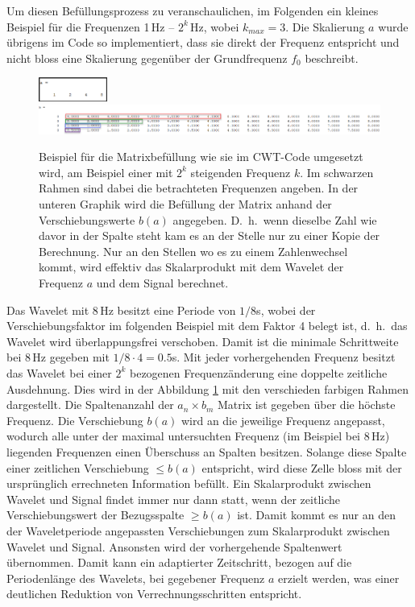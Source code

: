 Um diesen Befüllungsprozess zu veranschaulichen, im Folgenden ein
kleines Beispiel für die Frequenzen 1\,Hz – $2^k$\,Hz, wobei $k_{max}
= 3$.
Die Skalierung $a$ wurde übrigens im Code so implementiert, dass
sie direkt der Frequenz entspricht und nicht bloss eine Skalierung
gegenüber der Grundfrequenz $f_0$ beschreibt.

\begin{figure}
	\centering
	\includegraphics[width=0.2\textwidth]{papers/wavelets/images/17-1_a-Array.png}
	\includegraphics[width=\textwidth]{papers/wavelets/images/17-2_BspFillUp.png}
	\caption{Beispiel für die Matrixbefüllung wie sie im CWT-Code
	umgesetzt wird, am Beispiel einer mit $2^k$ steigenden
	Frequenz $k$.
	Im schwarzen Rahmen sind dabei die betrachteten Frequenzen angeben.
	In der unteren Graphik wird die Befüllung der Matrix anhand
	der Verschiebungswerte $b(a)$ angegeben.
	D.~h.~wenn dieselbe Zahl wie davor in der Spalte steht kam
	es an der Stelle nur zu einer Kopie der Berechnung.
	Nur an den Stellen wo es zu einem Zahlenwechsel kommt, wird
	effektiv das Skalarprodukt mit dem Wavelet der Frequenz $a$
	und dem Signal berechnet.}
	\label{wavelet:fig:BspFillUp}
\end{figure}

Das Wavelet mit 8\,Hz besitzt eine Periode von $1/8$s, wobei der
Verschiebungsfaktor im folgenden Beispiel mit dem Faktor 4 belegt
ist, d.~h.~das Wavelet wird überlappungsfrei verschoben.
Damit ist die minimale Schrittweite bei 8\,Hz gegeben mit $1/8\cdot4=0.5$s.
Mit jeder vorhergehenden Frequenz besitzt das Wavelet bei einer
$2^k$ bezogenen Frequenzänderung eine doppelte zeitliche Ausdehnung.
Dies wird in der Abbildung \ref{wavelet:fig:BspFillUp} mit den
verschieden farbigen Rahmen dargestellt.
Die Spaltenanzahl der $a_n \times b_m$ Matrix ist gegeben über die
höchste Frequenz.
Die Verschiebung $b(a)$ wird an die jeweilige Frequenz angepasst,
wodurch alle unter der maximal untersuchten Frequenz (im Beispiel
bei 8\,Hz) liegenden Frequenzen einen Überschuss an Spalten besitzen.
Solange diese Spalte einer zeitlichen Verschiebung $\leq b(a)$
entspricht, wird diese Zelle bloss mit der ursprünglich errechneten
Information befüllt.
Ein Skalarprodukt zwischen Wavelet und Signal findet immer nur dann
statt, wenn der zeitliche Verschiebungswert der Bezugsspalte $\geq
b(a)$ ist.
Damit kommt es nur an den der Waveletperiode angepassten Verschiebungen
zum Skalarprodukt zwischen Wavelet und Signal.
Ansonsten wird der vorhergehende Spaltenwert übernommen.
Damit kann ein adaptierter Zeitschritt, bezogen auf die Periodenlänge
des Wavelets, bei gegebener Frequenz $a$ erzielt werden, was einer
deutlichen Reduktion von Verrechnungsschritten entspricht.

